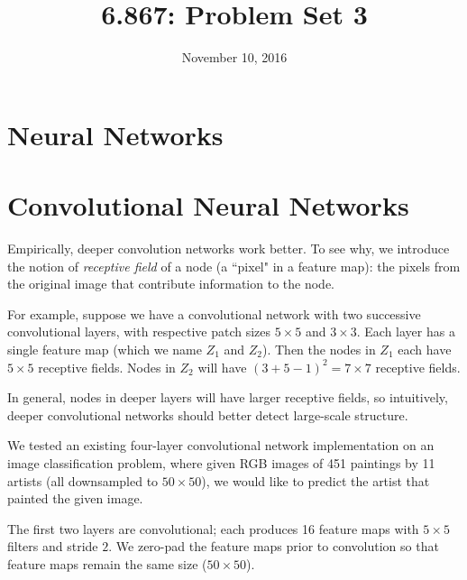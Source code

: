 \documentclass{article}
\title{6.867: Problem Set 3}
\date{November 10, 2016}
\begin{document}
\maketitle

\begin{multicols}{2}


\section{Neural Networks}
\label{sec:nn}

\section{Convolutional Neural Networks}


Empirically, deeper convolution networks work better.
To see why, we introduce the notion of \emph{receptive field}
of a node (a ``pixel" in a feature map):
the pixels from the original image that contribute information
to the node.

For example,
suppose we have a convolutional network
with two successive convolutional layers,
with respective patch sizes $5\times 5$ and $3\times 3$.
Each layer has a single feature map (which we name $Z_1$ and $Z_2$).
Then the nodes in $Z_1$ each have $5\times 5$ receptive fields.
Nodes in $Z_2$ will have $(3 + 5 - 1)^2 = 7\times 7$ receptive fields.

In general,
nodes in deeper layers will have larger receptive fields,
so intuitively,
deeper convolutional networks should better detect large-scale structure.

We tested an existing four-layer convolutional network implementation
on an image classification problem,
where given RGB images of 451 paintings by 11 artists
(all downsampled to $50\times 50$),
we would like to predict the artist that painted the given image.

The first two layers are convolutional;
each produces 16 feature maps
with $5\times 5$ filters and stride $2$.
We zero-pad the feature maps prior to convolution
so that feature maps remain the same size ($50\times 50$).


\end{multicols}
\end{document}
